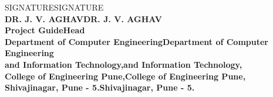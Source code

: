 \begin{center}		%

SIGNATURESIGNATURE\\
\normalsize{\bf{DR. J. V. AGHAVDR. J. V. AGHAV\\
Project GuideHead}\\
Department of Computer EngineeringDepartment of Computer Engineering\\
and Information Technology,and Information Technology,\\
College of Engineering Pune,College of Engineering Pune,\\
Shivajinagar, Pune - 5.Shivajinagar, Pune - 5.}
\end{center}

